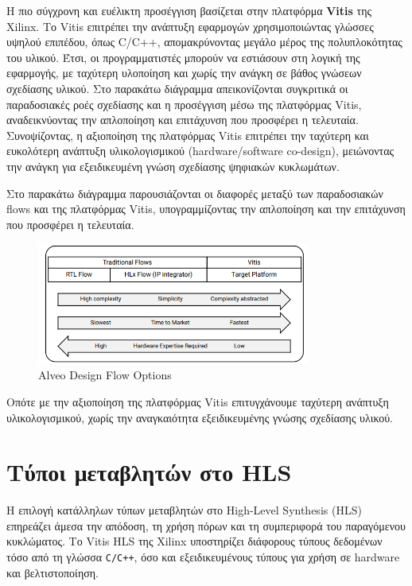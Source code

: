 Η πιο σύγχρονη και ευέλικτη προσέγγιση βασίζεται στην πλατφόρμα \textbf{Vitis} της Xilinx. Το Vitis επιτρέπει την ανάπτυξη εφαρμογών χρησιμοποιώντας γλώσσες υψηλού επιπέδου, όπως C/C++, απομακρύνοντας μεγάλο μέρος της πολυπλοκότητας του υλικού. Έτσι, οι προγραμματιστές μπορούν να εστιάσουν στη λογική της εφαρμογής, με ταχύτερη υλοποίηση και χωρίς την ανάγκη σε βάθος γνώσεων σχεδίασης υλικού.
Στο παρακάτω διάγραμμα απεικονίζονται συγκριτικά οι παραδοσιακές ροές σχεδίασης και η προσέγγιση μέσω της πλατφόρμας Vitis, αναδεικνύοντας την απλοποίηση και επιτάχυνση που προσφέρει η τελευταία.
Συνοψίζοντας, η αξιοποίηση της πλατφόρμας Vitis επιτρέπει την ταχύτερη και ευκολότερη ανάπτυξη υλικολογισμικού (hardware/software co-design), μειώνοντας την ανάγκη για εξειδικευμένη γνώση σχεδίασης ψηφιακών κυκλωμάτων.

Στο παρακάτω διάγραμμα παρουσιάζονται οι διαφορές μεταξύ των παραδοσιακών flows και της πλατφόρμας Vitis, υπογραμμίζοντας την απλοποίηση και την επιτάχυνση που προσφέρει η τελευταία.

\begin{figure}[h!]
  \centering
  \includegraphics[width=0.8\textwidth]{figures/chapter3/alveo_flow_options.png}
  \caption{Alveo Design Flow Options}
  \label{fig:alveo_flow_options}
\end{figure}

Οπότε με την αξιοποίηση της πλατφόρμας Vitis επιτυγχάνουμε ταχύτερη ανάπτυξη υλικολογισμικού, χωρίς την αναγκαιότητα εξειδικευμένης γνώσης σχεδίασης υλικού.

\section{Τύποι μεταβλητών στο HLS}

Η επιλογή κατάλληλων τύπων μεταβλητών στο High-Level Synthesis (HLS) επηρεάζει άμεσα την απόδοση, τη χρήση πόρων και τη συμπεριφορά του παραγόμενου κυκλώματος.
Το Vitis HLS της Xilinx υποστηρίζει διάφορους τύπους δεδομένων τόσο από τη γλώσσα \texttt{C/C++}, όσο και εξειδικευμένους τύπους για χρήση σε hardware και βελτιστοποίηση.

